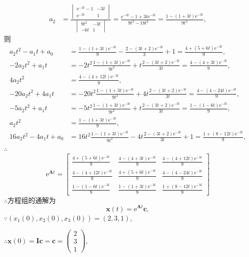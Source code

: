 \documentclass[12pt,UTF8]{ctexart}
\newcommand{\me}[0]{\mathrm e}
\begin{document}
\begin{enumerate}
\[\begin{aligned}
a_2&=\frac{\begin{vmatrix}\me^{-3t}-1&-3t\\\me^{-3t}&1\end{vmatrix}}{\begin{vmatrix}9t^2&-3t\\-6t&1\end{vmatrix}}=\frac{\me^{-3t}-1+3t\me^{-3t}}{9t^2-18t^2}=\frac{1-(1+3t)\me^{-3t}}{9t^2},
\end{aligned}\]
则
\[\begin{aligned}
a_2t^2-a_1t+a_0&=\frac{1-(1+3t)\me^{-3t}}9-\frac{2-(3t+2)\me^{-3t}}3+1=\frac{4+(5+6t)\me^{-3t}}9,\\
-2a_2t^2+a_1t&=-2t^2\frac{1-(1+3t)\me^{-3t}}{9t^2}+t\frac{2-(3t+2)\me^{-3t}}{3t}=\frac{4-(4+3t)\me^{-3t}}9,\\
4a_2t^2&=\frac{4-(4+12t)\me^{-3t}}9,\\
-20a_2t^2+4a_1t&=-20t^2\frac{1-(1+3t)\me^{-3t}}{9t^2}+4t\frac{2-(3t+2)\me^{-3t}}{3t}=\frac{4-(4-24t)\me^{-3t}}9,\\
-5a_2t^2+a_1t&=-5t^2\frac{1-(1+3t)\me^{-3t}}{9t^2}+t\frac{2-(3t+2)\me^{-3t}}{3t}=\frac{1-(1-6t)\me^{-3t}}9,\\
a_2t^2&=\frac{1-(1+3t)\me^{-3t}}9,\\
16a_2t^2-4a_1t+a_0&=16t^2\frac{1-(1+3t)\me^{-3t}}{9t^2}-4t\frac{2-(3t+2)\me^{-3t}}{3t}+1=\frac{1+(8-12t)\me^{-3t}}9,
\end{aligned}\]
$\therefore$
\[\me^{\bm At}=\begin{bmatrix}
\frac{4+(5+6t)\me^{-3t}}9&\frac{4-(4+3t)\me^{-3t}}9&\frac{4-(4+12t)\me^{-3t}}9\\
\frac{4-(4+12t)\me^{-3t}}9&\frac{4+(5+6t)\me^{-3t}}9&\frac{4-(4-24t)\me^{-3t}}9\\
\frac{1-(1-6t)\me^{-3t}}9&\frac{1-(1+3t)\me^{-3t}}9&\frac{1+(8-12t)\me^{-3t}}9
\end{bmatrix}\]
$\therefore$方程组的通解为
\[\bm x(t)=\me^{\bm At}\bm c,\]
$\because(x_1(0),x_2(0),x_3(0))=(2,3,1)$,

$\therefore\bm x(0)=\bm I\bm c=\bm c=\begin{pmatrix}2\\3\\1\end{pmatrix}$,


\end{enumerate}
\end{document}
